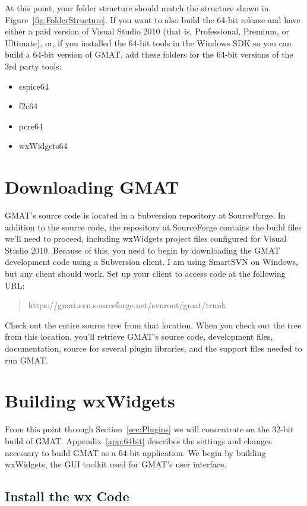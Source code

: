 \documentclass[letterpaper,10pt]{article}%
\begin{document}
\noindent At this point, your folder structure should match the structure shown in Figure~\ref{fig:FolderStructure}.  If you want to also build the 64-bit release and have either a paid version of Visual Studio 2010 (that is, Professional, Premium, or Ultimate), or, if you installed the 64-bit tools in the Windows SDK so you can build a 64-bit version of GMAT, add these folders for the 64-bit versions of the 3rd party tools:
\begin{itemize}
\item cspice64
\item f2c64
\item pcre64
\item wxWidgets64
\end{itemize}

\section{Downloading GMAT}

GMAT's source code is located in a Subversion repository at SourceForge.  In addition to the source code, the repository at SourceForge contains the build files we'll need to proceed, including wxWidgets project files configured for Visual Studio 2010.  Because of this, you need to begin by downloading the GMAT development code using a Subversion client.  I am using SmartSVN on Windows, but any client should work.  Set up your client to access code at the following URL:

\begin{quote}
https://gmat.svn.sourceforge.net/svnroot/gmat/trunk
\end{quote}
\noindent Check out the entire source tree from that location.  When you check out the tree from this location, you'll retrieve GMAT's source code, development files, documentation, source for several plugin libraries, and the support files needed to run GMAT. 

\section{Building wxWidgets}

From this point through Section~\ref{sec:Plugins} we will concentrate on the 32-bit build of GMAT.  Appendix~\ref{app:64bit} describes the settings and changes necessary to build GMAT as a 64-bit application.  We begin by building wxWidgets, the GUI toolkit used for GMAT's user interface.

\subsection{Install the wx Code}
\end{document}

